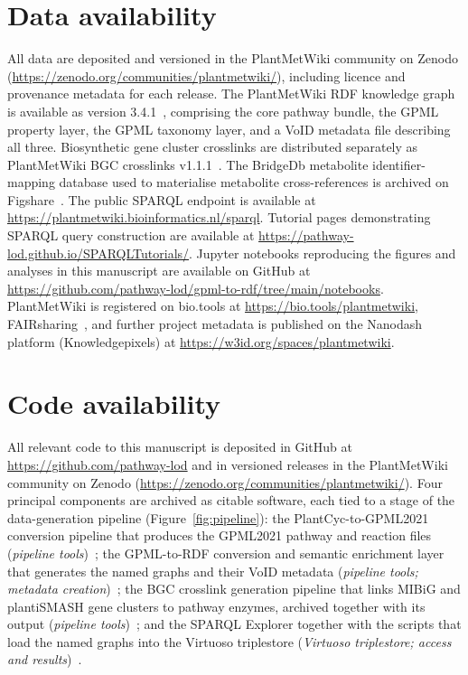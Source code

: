 \documentclass[11pt,a4paper]{article}
\begin{document}
\section*{Data availability}

All data are deposited and versioned in the PlantMetWiki community on Zenodo
(\url{https://zenodo.org/communities/plantmetwiki/}), including licence and provenance metadata for
each release. The PlantMetWiki RDF knowledge graph is available as version 3.4.1~\cite{delpup2026rdf},
comprising the core pathway bundle, the GPML property layer, the GPML taxonomy layer, and a VoID
metadata file describing all three. Biosynthetic gene cluster crosslinks are distributed separately as
PlantMetWiki BGC crosslinks v1.1.1~\cite{delpup2026bgc}. The BridgeDb metabolite
identifier-mapping database used to materialise metabolite cross-references is archived on
Figshare~\cite{bridgedb2026db}. The public SPARQL endpoint is available at
\url{https://plantmetwiki.bioinformatics.nl/sparql}. Tutorial pages demonstrating SPARQL query
construction are available at \url{https://pathway-lod.github.io/SPARQLTutorials/}. Jupyter notebooks
reproducing the figures and analyses in this manuscript are available on GitHub at
\url{https://github.com/pathway-lod/gpml-to-rdf/tree/main/notebooks}. PlantMetWiki is registered on
bio.tools at \url{https://bio.tools/plantmetwiki}, FAIRsharing~\cite{plantmetwiki2026fairsharing}, and further project metadata is published on the
Nanodash platform (Knowledgepixels) at \url{https://w3id.org/spaces/plantmetwiki}.


\section*{Code availability}

All relevant code to this manuscript is deposited in GitHub at \url{https://github.com/pathway-lod}
and in versioned releases in the PlantMetWiki community on Zenodo
(\url{https://zenodo.org/communities/plantmetwiki/}). Four principal components are archived as
citable software, each tied to a stage of the data-generation pipeline (Figure~\ref{fig:pipeline}): the
PlantCyc-to-GPML2021 conversion pipeline that produces the GPML2021 pathway and reaction files
(\emph{pipeline tools})~\cite{delpup2026cyc2wiki}; the GPML-to-RDF conversion and semantic enrichment
layer that generates the named graphs and their VoID metadata (\emph{pipeline tools; metadata
creation})~\cite{delpup2026gpml2rdf}; the BGC crosslink generation pipeline that links MIBiG and
plantiSMASH gene clusters to pathway enzymes, archived together with its output
(\emph{pipeline tools})~\cite{delpup2026bgc}; and the SPARQL Explorer together with the scripts
that load the named graphs into the Virtuoso triplestore (\emph{Virtuoso triplestore; access and
results})~\cite{delpup2026snorql}.
\end{document}
